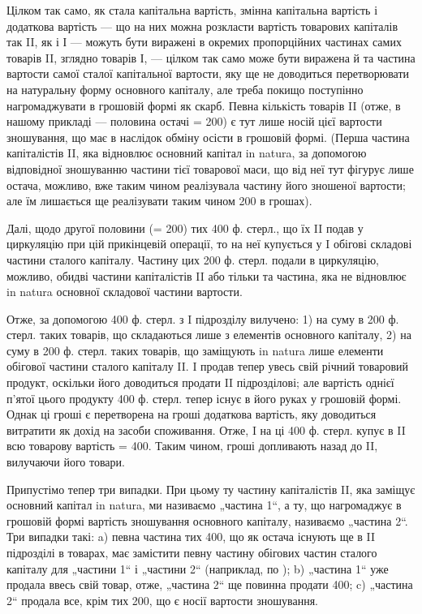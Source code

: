 Цілком так само, як стала капітальна вартість, змінна капітальна вартість
і додаткова вартість — що на них можна розкласти вартість товарових
капіталів так II, як і І — можуть бути виражені в окремих пропорційних
частинах самих товарів II, зглядно товарів І, — цілком так само
може бути виражена й та частина вартости самої сталої капітальної вартости,
яку ще не доводиться перетворювати на натуральну форму основного
капіталу, але треба покищо поступінно нагромаджувати в грошовій
формі як скарб. Певна кількість товарів II (отже, в нашому прикладі —
половина остачі = 200) є тут лише носій цієї вартости зношування, що
має в наслідок обміну осісти в грошовій формі. (Перша частина капіталістів
II, яка відновлює основний капітал in natura, за допомогою відповідної
зношуванню частини тієї товарової маси, що від неї тут фігурує
лише остача, можливо, вже таким чином реалізувала частину його зношеної
вартости; але їм лишається ще реалізувати таким чином
200 в грошах).

Далі, щодо другої половини (= 200) тих 400 ф. стерл., що їх II
подав у циркуляцію при цій прикінцевій операції, то на неї купується
у I обігові складові частини сталого капіталу. Частину цих 200 ф. стерл.
подали в циркуляцію, можливо, обидві частини капіталістів II або тільки
та частина, яка не відновлює in natura основної складової частини
вартости.

Отже, за допомогою 400 ф. стерл. з I підрозділу вилучено: 1) на
суму в 200 ф. стерл. таких товарів, що складаються лише з елементів
основного капіталу, 2) на суму в 200 ф. стерл. таких товарів, що заміщують
in natura лише елементи обігової частини сталого капіталу II.
I продав тепер увесь свій річний товаровий продукт, оскільки його доводиться
продати II підрозділові; але вартість однієї п’ятої цього продукту
400 ф. стерл. тепер існує в його руках у грошовій формі. Однак ці
гроші є перетворена на гроші додаткова вартість, яку доводиться витратити
як дохід на засоби споживання. Отже, I на ці 400 ф. стерл. купує
в II всю товарову вартість = 400. Таким чином, гроші допливають назад
до II, вилучаючи його товари.

Припустімо тепер три випадки. При цьому ту частину капіталістів II,
яка заміщує основний капітал in natura, ми називаємо „частина 1“, а
ту, що нагромаджує в грошовій формі вартість зношування основного
капіталу, називаємо „частина 2“. Три випадки такі: a) певна частина тих
400, що як остача існують ще в II підрозділі в товарах, має замістити певну
частину обігових частин сталого капіталу для „частини 1“ і „частини 2“
(наприклад, по ); b) „частина 1“ уже продала ввесь свій товар, отже,
„частина 2“ ще повинна продати 400; c) „частина 2“ продала все, крім
тих 200, що є носії вартости зношування.

